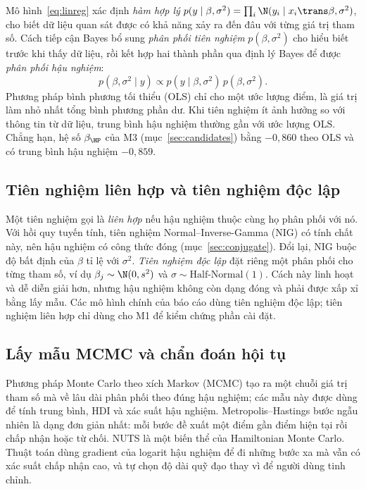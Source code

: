\documentclass[12pt,a4paper]{report}
\begin{document}
Mô hình~\eqref{eq:linreg} xác định \emph{hàm hợp lý}
$p(y \mid \beta, \sigma^2) = \prod_i \N(y_i \mid x_i\trans \beta, \sigma^2)$,
cho biết dữ liệu quan sát được có khả năng xảy ra đến đâu với từng giá trị tham
số. Cách tiếp cận Bayes bổ sung \emph{phân phối tiên nghiệm}
$p(\beta, \sigma^2)$ cho hiểu biết trước khi thấy dữ liệu, rồi kết hợp hai thành
phần qua định lý Bayes để được \emph{phân phối hậu nghiệm}:
%
\begin{equation}
  \label{eq:bayes}
  p(\beta, \sigma^2 \mid y) \propto p(y \mid \beta, \sigma^2)\, p(\beta, \sigma^2).
\end{equation}
%
Phương pháp bình phương tối thiểu (OLS) chỉ cho một ước lượng điểm, là giá trị
làm nhỏ nhất tổng bình phương phần dư. Khi tiên nghiệm ít ảnh hưởng so với thông
tin từ dữ liệu, trung bình hậu nghiệm thường gần với ước lượng OLS. Chẳng hạn,
hệ số $\beta_{\HP}$ của M3 (mục~\ref{sec:candidates}) bằng $-0{,}860$ theo OLS
và có trung bình hậu nghiệm $-0{,}859$.

\subsection{Tiên nghiệm liên hợp và tiên nghiệm độc lập}

Một tiên nghiệm gọi là \emph{liên hợp} nếu hậu nghiệm thuộc cùng họ phân phối
với nó. Với hồi quy tuyến tính, tiên nghiệm Normal--Inverse-Gamma (NIG) có tính
chất này, nên hậu nghiệm có công thức đóng (mục~\ref{sec:conjugate}). Đổi lại,
NIG buộc độ bất định của $\beta$ tỉ lệ với $\sigma^2$. \emph{Tiên nghiệm độc
lập} đặt riêng một phân phối cho từng tham số, ví dụ $\beta_j \sim \N(0, s^2)$
và $\sigma \sim \text{Half-Normal}(1)$. Cách này linh hoạt và dễ diễn giải hơn,
nhưng hậu nghiệm không còn dạng đóng và phải được xấp xỉ bằng lấy mẫu. Các mô
hình chính của báo cáo dùng tiên nghiệm độc lập; tiên nghiệm liên hợp chỉ dùng
cho M1 để kiểm chứng phần cài đặt.

\subsection{Lấy mẫu MCMC và chẩn đoán hội tụ}

Phương pháp Monte Carlo theo xích Markov (MCMC) tạo ra một chuỗi giá trị tham số
mà về lâu dài phân phối theo đúng hậu nghiệm; các mẫu này được dùng để tính
trung bình, HDI và xác suất hậu nghiệm. Metropolis--Hastings bước ngẫu nhiên
\cite{hastings1970} là dạng đơn giản nhất: mỗi bước đề xuất một điểm gần điểm hiện tại rồi chấp nhận
hoặc từ chối. NUTS \cite{hoffman2014nuts} là một biến thể của Hamiltonian Monte
Carlo. Thuật toán dùng gradient của logarit hậu nghiệm để đi những bước xa mà
vẫn có xác suất chấp nhận cao, và tự chọn độ dài quỹ đạo thay vì để người dùng
tinh chỉnh.
\end{document}
